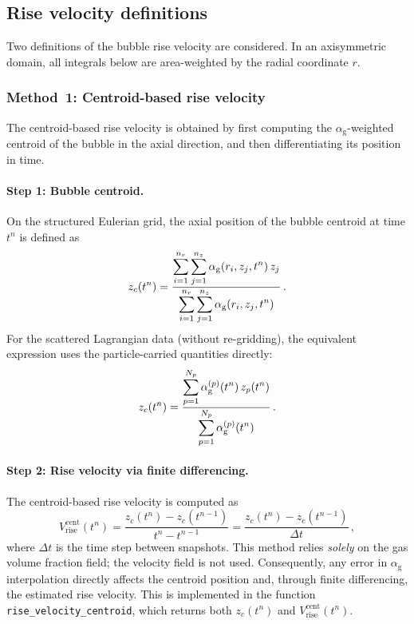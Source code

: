 \documentclass[11pt,a4paper]{article}
\newcommand{\alphag}{\alpha_{\mathrm{g}}}
\begin{document}
\subsection{Rise velocity definitions}
\label{sec:rise_vel_defs}

Two definitions of the bubble rise velocity are considered.  In an
axisymmetric domain, all integrals below are area-weighted by the radial
coordinate $r$.

\subsubsection{Method~1: Centroid-based rise velocity}
\label{sec:centroid}

The centroid-based rise velocity is obtained by first computing the
$\alphag$-weighted centroid of the bubble in the axial direction, and then
differentiating its position in time.

\paragraph{Step 1: Bubble centroid.}
On the structured Eulerian grid, the axial position of the bubble centroid
at time $t^n$ is defined as
\begin{equation}\label{eq:centroid_euler}
  z_c(t^n) = \frac{%
    \displaystyle\sum_{i=1}^{n_r}\sum_{j=1}^{n_z}
      \alphag(r_i,z_j,t^n)\, z_j
  }{%
    \displaystyle\sum_{i=1}^{n_r}\sum_{j=1}^{n_z}
      \alphag(r_i,z_j,t^n)
  }\,.
\end{equation}
For the scattered Lagrangian data (without re-gridding), the equivalent
expression uses the particle-carried quantities directly:
\begin{equation}\label{eq:centroid_lag}
  z_c(t^n) = \frac{%
    \displaystyle\sum_{p=1}^{N_p} \alphag^{(p)}(t^n)\, z_p(t^n)
  }{%
    \displaystyle\sum_{p=1}^{N_p} \alphag^{(p)}(t^n)
  }\,.
\end{equation}

\paragraph{Step 2: Rise velocity via finite differencing.}
The centroid-based rise velocity is computed as
\begin{equation}\label{eq:vrise_centroid}
  V_{\mathrm{rise}}^{\mathrm{cent}}(t^n)
  = \frac{z_c(t^n) - z_c(t^{n-1})}{t^n - t^{n-1}}
  = \frac{z_c(t^n) - z_c(t^{n-1})}{\Delta t}\,,
\end{equation}
where $\Delta t$ is the time step between snapshots.  This method relies
\emph{solely} on the gas volume fraction field; the velocity field is not
used.  Consequently, any error in $\alphag$ interpolation directly affects
the centroid position and, through finite differencing, the estimated rise
velocity.  This is implemented in the function
\texttt{rise\_velocity\_centroid}, which returns both $z_c(t^n)$ and
$V_{\mathrm{rise}}^{\mathrm{cent}}(t^n)$.
\end{document}
